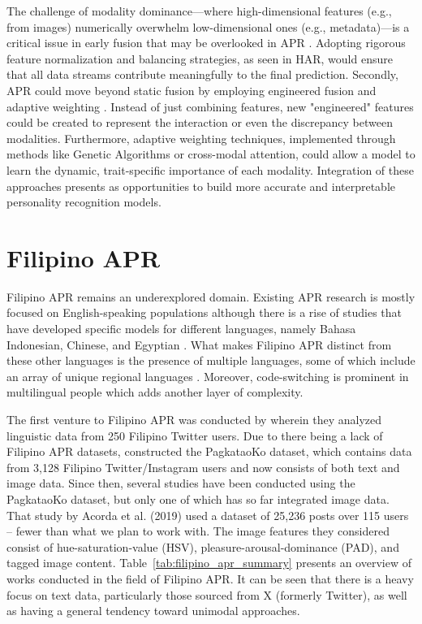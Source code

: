 The challenge of modality dominance—where high-dimensional features (e.g., from images) numerically overwhelm low-dimensional ones (e.g., metadata)—is a critical issue in early fusion that may be overlooked in APR \citep{Ehatisham-Ul-Haq_Javed_Azam_Malik_Irtaza_Lee_Mahmood_2019}. Adopting rigorous feature normalization and balancing strategies, as seen in HAR, would ensure that all data streams contribute meaningfully to the final prediction. Secondly, APR could move beyond static fusion by employing engineered fusion and adaptive weighting \citep{Cai_Qu_Li_Zhang_Hu_Hu_2020}. Instead of just combining features, new "engineered" features could be created to represent the interaction or even the discrepancy between modalities. Furthermore, adaptive weighting techniques, implemented through methods like Genetic Algorithms or cross-modal attention, could allow a model to learn the dynamic, trait-specific importance of each modality. Integration of these approaches presents as opportunities to build more accurate and interpretable personality recognition models.

\section{Filipino APR}
\label{sec: FilipinoAPR}
Filipino APR remains an underexplored domain. Existing APR research is mostly focused on English-speaking populations although there is a rise of studies that have developed specific models for different languages, namely Bahasa Indonesian, Chinese, and Egyptian \citep{Siddique2019, Salem2019, Adi2018}. What makes Filipino APR distinct from these other languages is the presence of multiple languages, some of which include an array of unique regional languages \citep{tighe_modeling_2018}. Moreover, code-switching is prominent in multilingual people which adds another layer of complexity.

The first venture to Filipino APR was conducted by \citet{tighe_modeling_2018} wherein they analyzed linguistic data from 250 Filipino Twitter users. Due to there being a lack of Filipino APR datasets, \citet{tighe_acorda_2022} constructed the PagkataoKo dataset, which contains data from 3,128 Filipino Twitter/Instagram users and now consists of both text and image data. Since then, several studies have been conducted using the PagkataoKo dataset, but only one of which has so far integrated image data. That study by Acorda et al. (2019) used a dataset of 25,236 posts over 115 users – fewer than what we plan to work with. The image features they considered consist of hue-saturation-value (HSV), pleasure-arousal-dominance (PAD), and tagged image content. Table~\ref{tab:filipino_apr_summary} presents an overview of works conducted in the field of Filipino APR. It can be seen that there is a heavy focus on text data, particularly those sourced from X (formerly Twitter), as well as having a general tendency toward unimodal approaches. 

